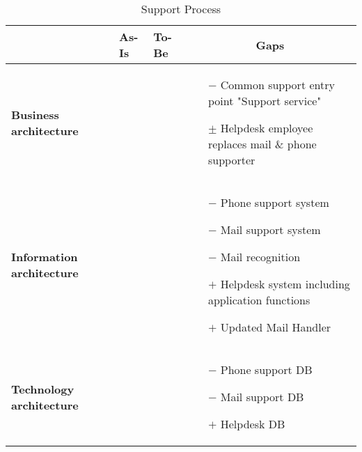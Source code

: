 \begin{table}[H]
	\centering
	\begin{tabular}{|p{2.4cm}|l|l|p{7.5cm}|}
		\hline
		\textbf{} & \textbf{As-Is} & \textbf{To-Be} & \multicolumn{1}{c|}{\textbf{Gaps}} \\ \hline
		\textbf{Business architecture} &  &  & \begin{itemize}\vspace{-0.5cm}
		\item[$-$] Common support entry point "Support service"
		\item[$\pm$] Helpdesk employee replaces mail \& phone supporter
		\end{itemize}\vspace{-0.7cm} \\ \hline 

		\textbf{Information architecture} &  &  & \begin{itemize}\vspace{-0.5cm}
		\item[$-$] Phone support system
		\item[$-$] Mail support system
		\item[$-$] Mail recognition
		\item[$+$] Helpdesk system including application functions
		\item[$+$] Updated Mail Handler
		\end{itemize}\vspace{-0.7cm} \\ \hline

		\textbf{Technology architecture} &  &  & \begin{itemize}\vspace{-0.5cm}
		\item[$-$] Phone support DB
		\item[$-$] Mail support DB
		\item[$+$] Helpdesk DB
		\end{itemize}\vspace{-0.7cm} \\ \hline
	\end{tabular}	
	\caption{Support Process}
	\label{table:gaps_support}
\end{table}